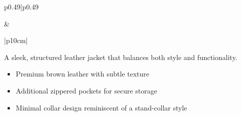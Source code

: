 \documentclass[landscape]{article}
\begin{document}
\begin{tabular}{p{0.49\textwidth}|p{0.49\textwidth}}
\begin{center}
\end{center}
&
\begin{center}
\begin{tabular}{|p{10cm}|}
\hline
{} \\
\hline
\begin{minipage}[t]{\linewidth}
\vspace{0.3cm}
A sleek, structured leather jacket that balances both style and functionality.
\begin{itemize}[leftmargin=*, label={\textcolor{accentgold}{}}]
  \item Premium brown leather with subtle texture
  \item Additional zippered pockets for secure storage
  \item Minimal collar design reminiscent of a stand-collar style
\end{itemize}
\vspace{0.3cm}
\end{minipage} \\
\hline
\end{tabular}
\end{center}
\end{tabular}

\newpage
\end{document}
